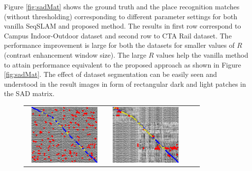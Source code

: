 \documentclass[letterpaper, 10 pt, conference]{ieeeconf}  %
\begin{document}
Figure \ref{fig:sadMat} shows the ground truth and the place recognition matches (without thresholding) corresponding to different parameter settings for both vanilla SeqSLAM and proposed method. The results in first row correspond to Campus Indoor-Outdoor dataset and second row to CTA Rail dataset. The performance improvement is large for both the datasets for smaller values of $R$ (contrast enhancement window size). The large $R$ values help the vanilla method to attain performance equivalent to the proposed approach as shown in Figure \ref{fig:sadMat}. The effect of dataset segmentation can be easily seen and understood in the result images in form of rectangular dark and light patches in the SAD matrix. 

\newcommand{\imgH}{3cm}
\newcommand{\imgW}{4cm}
\begin{figure}[!h]
 \begin{tabular*}{\textwidth}[t]{cccc}
  \includegraphics[width=\imgW,height=\imgH]{campus-io-without-bad-101} &
  \includegraphics[width=\imgW,height=\imgH]{campus-io-with-bad-71} &

\end{tabular*}
\end{figure}
\end{document}
